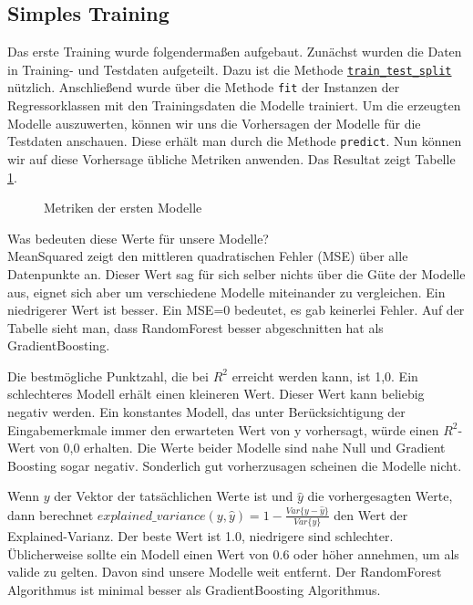 \documentclass[a4paper,10pt]{scrartcl}
\begin{document}
 \subsection{Simples Training}
 Das erste Training wurde folgendermaßen aufgebaut. Zunächst wurden die Daten in Training- und Testdaten aufgeteilt. Dazu ist die Methode \href{https://scikit-learn.org/stable/modules/generated/sklearn.model_selection.train_test_split.html}{\lstinline|train_test_split|} nützlich. Anschließend wurde über die Methode \lstinline|fit| der Instanzen der Regressorklassen mit den Trainingsdaten die Modelle trainiert. Um die erzeugten Modelle auszuwerten, können wir uns die Vorhersagen der Modelle für die Testdaten anschauen. Diese erhält man durch die Methode \lstinline|predict|. Nun können wir auf diese Vorhersage übliche Metriken anwenden. Das Resultat zeigt Tabelle \ref{fig:firstresult}.\\
 \begin{figure}[h]
 	\centering
 	\caption{Metriken der ersten Modelle}
 	\label{fig:firstresult}
 \end{figure} 
Was bedeuten diese Werte für unsere Modelle?\\
 MeanSquared zeigt den mittleren quadratischen Fehler (MSE) über alle Datenpunkte an. Dieser Wert sag für sich selber nichts über die Güte der Modelle aus, eignet sich aber um verschiedene Modelle miteinander zu vergleichen. Ein niedrigerer Wert ist besser. Ein MSE=0 bedeutet, es gab keinerlei Fehler. Auf der Tabelle sieht man, dass RandomForest besser abgeschnitten hat als GradientBoosting.

Die bestmögliche Punktzahl, die bei $R^2$ erreicht werden kann, ist 1,0. Ein schlechteres Modell erhält einen kleineren Wert. Dieser Wert kann beliebig negativ werden. Ein konstantes Modell, das unter Berücksichtigung der Eingabemerkmale immer den erwarteten Wert von y vorhersagt, würde einen $R^2$-Wert von 0,0 erhalten. Die Werte beider Modelle sind nahe Null und Gradient Boosting sogar negativ. Sonderlich gut vorherzusagen scheinen die Modelle nicht.

Wenn $y$ der Vektor der tatsächlichen Werte ist und $\hat{y}$ die vorhergesagten Werte, dann berechnet $explained\_{}variance(y, \hat{y}) = 1 - \frac{Var\{ y - \hat{y}\}}{Var\{y\}}$ den Wert der Explained-Varianz. Der beste Wert ist 1.0, niedrigere sind schlechter. Üblicherweise sollte ein Modell einen Wert von 0.6 oder höher annehmen, um als valide zu gelten. Davon sind unsere Modelle weit entfernt. Der RandomForest Algorithmus ist minimal besser als GradientBoosting Algorithmus. 
\end{document}
